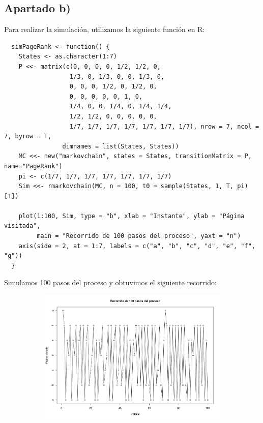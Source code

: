 \documentclass[11pt]{article}
\begin{document}

\newpage
\subsection*{Apartado b)}

Para realizar la simulación, utilizamos la siguiente función en R:
\begin{verbatim}
  simPageRank <- function() {
    States <- as.character(1:7)
    P <<- matrix(c(0, 0, 0, 0, 1/2, 1/2, 0, 
                  1/3, 0, 1/3, 0, 0, 1/3, 0,
                  0, 0, 0, 1/2, 0, 1/2, 0,
                  0, 0, 0, 0, 0, 1, 0,
                  1/4, 0, 0, 1/4, 0, 1/4, 1/4,
                  1/2, 1/2, 0, 0, 0, 0, 0,
                  1/7, 1/7, 1/7, 1/7, 1/7, 1/7, 1/7), nrow = 7, ncol = 7, byrow = T,
                dimnames = list(States, States))
    MC <<- new("markovchain", states = States, transitionMatrix = P, name="PageRank")
    pi <- c(1/7, 1/7, 1/7, 1/7, 1/7, 1/7, 1/7)
    Sim <<- rmarkovchain(MC, n = 100, t0 = sample(States, 1, T, pi)[1])
    
    plot(1:100, Sim, type = "b", xlab = "Instante", ylab = "Página visitada",
         main = "Recorrido de 100 pasos del proceso", yaxt = "n")
    axis(side = 2, at = 1:7, labels = c("a", "b", "c", "d", "e", "f", "g"))
  }
\end{verbatim}

Simulamos 100 pasos del proceso y obtuvimos el siguiente recorrido:

\begin{figure}[h!]
  \begin{center}
    \begin{subfigure}[b]{\linewidth}
      \includegraphics[width=\linewidth]{recorridoPageRank.pdf}
    \end{subfigure}
  \end{center}
\end{figure}
\end{document}

